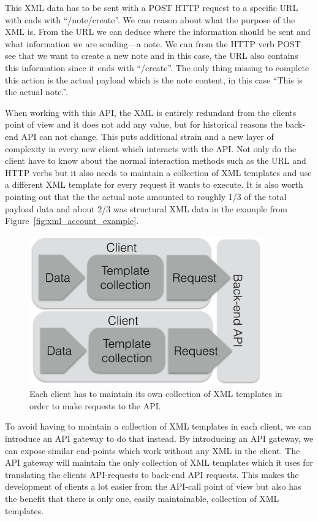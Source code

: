 \documentclass{cslthse-msc}
\begin{document}
This XML data has to be sent with a POST HTTP request to a specific URL with ends with \enquote{/note/create}. We can reason about what the purpose of the XML is. From the URL we can deduce where the information should be sent and what information we are sending---a note. We can from the HTTP verb POST see that we want to create a new note and in this case, the URL also contains this information since it ends with \enquote{/create}. The only thing missing to complete this action is the actual payload which is the note content, in this case \enquote{This is the actual note.}.

When working with this API, the XML is entirely redundant from the clients point of view and it does not add any value, but for historical reasons the back-end API can not change. This puts additional strain and a new layer of complexity in every new client which interacts with the API. Not only do the client have to know about the normal interaction methods such as the URL and HTTP verbs but it also needs to maintain a collection of XML templates and use a different XML template for every request it wants to execute. It is also worth pointing out that the the actual note amounted to roughly 1/3 of the total payload data and about 2/3 was structural XML data in the example from Figure~\ref{fig:xml_account_example}.

\begin{figure}[H]
  \centering
    \begin{center}
      \includegraphics[width=0.9\textwidth]{images/client_templates.png}
    \end{center}
  \caption{Each client has to maintain its own collection of XML templates in order to make requests to the API.}
\end{figure}

To avoid having to maintain a collection of XML templates in each client, we can introduce an API gateway to do that instead. By introducing an API gateway, we can expose similar end-points which work without any XML in the client. The API gateway will maintain the only collection of XML templates which it uses for translating the clients API-requests to back-end API requests. This makes the development of clients a lot easier from the API-call point of view but also has the benefit that there is only one, easily maintainable, collection of XML templates.
\end{document}
